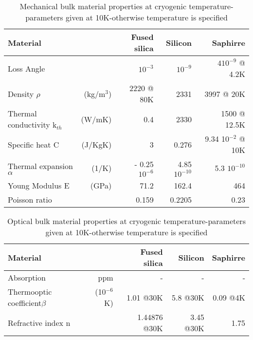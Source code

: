 \begin{table}
\begin{center}
\begin{tabular}{|l r||r|r|r|}
  \hline
    {\large\strut} Material  & & Fused silica & Silicon & Saphirre \\
  \hline
  \hline
   {\large\strut} Loss Angle & & $10^{-3}$ & $10^{-9}$ & $4 10^{-9}$ @ 4.2K \\
   {\large\strut} Density $\rho$ & (kg/m$^3$) & 2220 @ 80K & 2331 & 3997 @ 20K\\
   {\large\strut} Thermal conductivity k$_{th}$ & (W/mK) & 0.4 & 2330 & 1500 @ 12.5K\\
   {\large\strut} Specific heat C & (J/KgK) & 3 & 0.276 & 9.34 10$^{-2}$ @ 10K\\
   {\large\strut} Thermal expansion $\alpha$ & (1/K) &  - 0.25 $10^{-6}$  & 4.85 $10^{-10}$ & 5.3 $10^{-10}$\\
   {\large\strut} Young Modulus E & (GPa) &  71.2 & 162.4 & 464\\
   {\large\strut} Poisson ratio & & 0.159 & 0.2205 & 0.23\\
  \hline
\end{tabular}
\end{center}
\caption{Mechanical bulk material properties at cryogenic
temperature-parameters given at 10K-otherwise temperature is specified}
\label{tab:Mech_Bulk_Param_cryo}
\end{table}

\begin{table}
\begin{center}
\begin{tabular}{|l r||r|r|r|}
  \hline
    {\large\strut} Material  & & Fused silica & Silicon & Saphirre \\
  \hline
  \hline
  {\large\strut} Absorption & ppm & - & - & - \\
  {\large\strut} \parbox{0.1\linewidth} {Thermooptic \\ coefficient$\beta$}  & (10$^{-6}$K) & 1.01 @30K & 5.8 @30K & 0.09 @4K \\
  {\large\strut} Refractive index n & & 1.44876 @30K & 3.45 @30K & 1.75\\
 \hline
\end{tabular}
\end{center}
\caption{Optical bulk material properties at cryogenic temperature-parameters
given at 10K-otherwise temperature is specified}
\label{tab:Optics_Bulk_Param_cryo}
\end{table}


